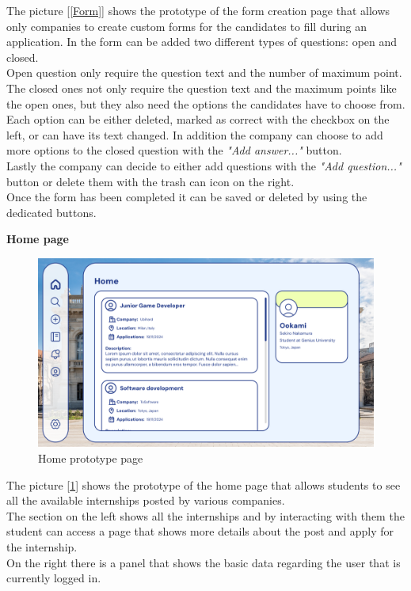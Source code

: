 \documentclass[11pt,twoside]{article}
\begin{document}
The picture [\ref{Form}] shows the prototype of the form creation page that allows only companies to create custom forms for the candidates to fill during an application. In the form can be added two different types of questions: open and closed.\\
Open question only require the question text and the number of maximum point. \\
The closed ones not only require the question text and the maximum points like the open ones, but they also need the options the candidates have to choose from. Each option can be either deleted, marked as correct with the checkbox on the left, or can have its text changed. In addition the company can choose to add more options to the closed question with the \textit{"Add answer..."} button. \\
Lastly the company can decide to either add questions with the \textit{"Add question..."} button or delete them with the trash can icon on the right.\\
Once the form has been completed it can be saved or deleted by using the dedicated buttons.

\newpage

\large{\textbf{Home page}}
\begin{figure}[H]
\includegraphics[width=\textwidth]{Images/Home}
\caption{Home prototype page}\label{Home}
\end{figure}
The picture [\ref{Home}] shows the prototype of the home page that allows students to see all the available internships posted by various companies.\\
The section on the left shows all the internships and by interacting with them the student can access a page that shows more details about the post and apply for the internship.\\
On the right there is a panel that shows the basic data regarding the user that is currently logged in.
\end{document}
